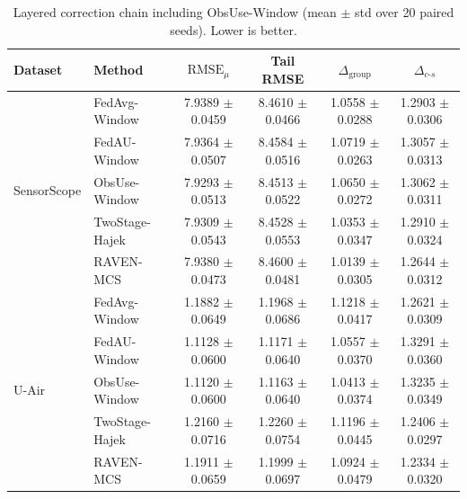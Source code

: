 \begin{table}[t]
\centering
\caption{Layered correction chain including ObsUse-Window
(mean $\pm$ std over 20 paired seeds). Lower is better.}
\label{tab:e3_obsuse}
\begin{tabular}{llcccc}
\toprule
Dataset & Method & $\mathrm{RMSE}_{\mu}$ & Tail RMSE &
$\Delta_{\mathrm{group}}$ & $\Delta_{c\text{-}s}$\\
\midrule
\multirow{5}{*}{SensorScope}
& FedAvg-Window    & 7.9389 $\pm$ 0.0459 & 8.4610 $\pm$ 0.0466 & 1.0558 $\pm$ 0.0288 & 1.2903 $\pm$ 0.0306\\
& FedAU-Window     & 7.9364 $\pm$ 0.0507 & 8.4584 $\pm$ 0.0516 & 1.0719 $\pm$ 0.0263 & 1.3057 $\pm$ 0.0313\\
& ObsUse-Window    & 7.9293 $\pm$ 0.0513 & 8.4513 $\pm$ 0.0522 & 1.0650 $\pm$ 0.0272 & 1.3062 $\pm$ 0.0311\\
& TwoStage-Hajek   & 7.9309 $\pm$ 0.0543 & 8.4528 $\pm$ 0.0553 & 1.0353 $\pm$ 0.0347 & 1.2910 $\pm$ 0.0324\\
& RAVEN-MCS        & 7.9380 $\pm$ 0.0473 & 8.4600 $\pm$ 0.0481 & 1.0139 $\pm$ 0.0305 & 1.2644 $\pm$ 0.0312\\
\midrule
\multirow{5}{*}{U-Air}
& FedAvg-Window    & 1.1882 $\pm$ 0.0649 & 1.1968 $\pm$ 0.0686 & 1.1218 $\pm$ 0.0417 & 1.2621 $\pm$ 0.0309\\
& FedAU-Window     & 1.1128 $\pm$ 0.0600 & 1.1171 $\pm$ 0.0640 & 1.0557 $\pm$ 0.0370 & 1.3291 $\pm$ 0.0360\\
& ObsUse-Window    & 1.1120 $\pm$ 0.0600 & 1.1163 $\pm$ 0.0640 & 1.0413 $\pm$ 0.0374 & 1.3235 $\pm$ 0.0349\\
& TwoStage-Hajek   & 1.2160 $\pm$ 0.0716 & 1.2260 $\pm$ 0.0754 & 1.1196 $\pm$ 0.0445 & 1.2406 $\pm$ 0.0297\\
& RAVEN-MCS        & 1.1911 $\pm$ 0.0659 & 1.1999 $\pm$ 0.0697 & 1.0924 $\pm$ 0.0479 & 1.2334 $\pm$ 0.0320\\
\bottomrule
\end{tabular}
\end{table}
